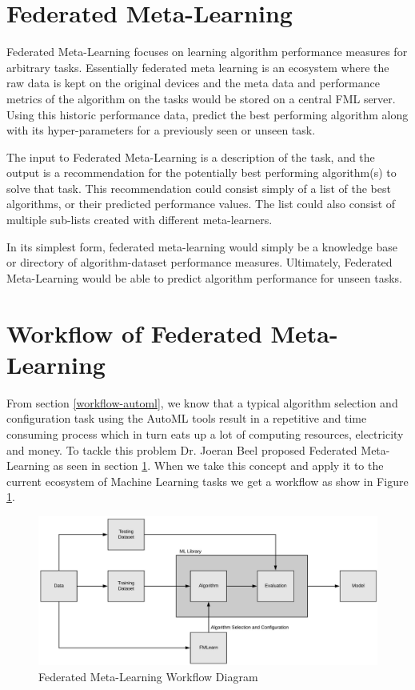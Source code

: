 \section{Federated Meta-Learning}
\label{federated-meta-learning}

Federated Meta-Learning focuses on learning algorithm performance measures for arbitrary tasks. Essentially federated meta learning is an ecosystem where the raw data is kept on the original devices and the meta data and performance metrics of the algorithm on the tasks would be stored on a central FML server. Using this historic performance data, predict the best performing algorithm along with its hyper-parameters for a previously seen or unseen task.

The input to Federated Meta-Learning is a description of the task, and the output is a recommendation for the potentially best performing algorithm(s) to solve that task. This recommendation could consist simply of a list of the best algorithms, or their predicted performance values. The list could also consist of multiple sub-lists created with different meta-learners.

In its simplest form, federated meta-learning would simply be a knowledge base or directory of algorithm-dataset performance measures. Ultimately, Federated Meta-Learning would be able to predict algorithm performance for unseen tasks.

\section{Workflow of Federated Meta-Learning}
\label{fml-workflow}

From section \ref{workflow-automl}, we know that a typical algorithm selection and configuration task using the AutoML tools result in a repetitive and time consuming process which in turn eats up a lot of computing resources, electricity and money. To tackle this problem Dr. Joeran Beel proposed Federated Meta-Learning as seen in section \ref{federated-meta-learning}. When we take this concept and apply it to the current ecosystem of Machine Learning tasks we get a workflow as show in Figure \ref{fml-workflow-diagram}.

\begin{figure}[t]
    \centering
    \includegraphics[width=15cm]{images/FML Workflow.jpeg}
    \caption{Federated Meta-Learning Workflow Diagram}
    \label{fml-workflow-diagram}
\end{figure}

